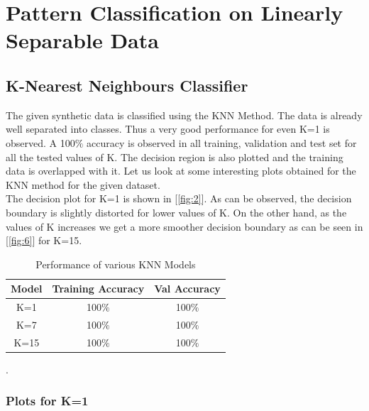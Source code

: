 \section{Pattern Classification on Linearly Separable Data}

\subsection{K-Nearest Neighbours Classifier}

The given synthetic data is classified using the KNN Method. The data is already well separated into classes. Thus a very good performance for even K=1 is observed. A 100$\%$ accuracy is observed in all training, validation and test set for all the tested values of K. The decision region is also plotted and the training data is overlapped with it. Let us look at some interesting plots obtained for the KNN method for the given dataset. \\

The decision plot for K=1 is shown in [\ref{fig:2}]. As can be observed, the decision boundary is slightly distorted for lower values of K. On the other hand, as the values of K increases we get a more smoother decision boundary as can be seen in [\ref{fig:6}] for K=15. 


{
\begin{table}[!h]
\centering
\begin{tabular}{ |c|c|c|  }
\hline
\rowcolor{lightgray} Model & Training Accuracy & Val Accuracy\\
\hline
K=1 & 100$\%$  & 100$\%$ \\   
 \hline
K=7 & 100$\%$  & 100$\%$ \\ 
 \hline
K=15 & 100$\%$  & 100$\%$ \\ 
\hline
\end{tabular}
\caption{Performance of various KNN Models}.
\label{table:1}
\end{table}
}

\newpage
\subsubsection*{Plots for K=1}

